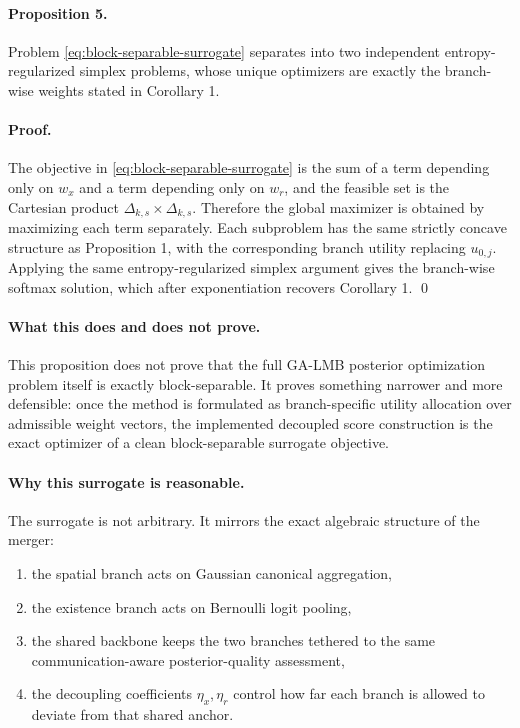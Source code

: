 \paragraph{Proposition 5.}
Problem \eqref{eq:block-separable-surrogate} separates into two independent entropy-regularized simplex problems, whose unique optimizers are exactly the branch-wise weights stated in Corollary 1.

\paragraph{Proof.}
The objective in \eqref{eq:block-separable-surrogate} is the sum of a term depending only on $w_x$ and a term depending only on $w_r$, and the feasible set is the Cartesian product $\Delta_{k,s}\times\Delta_{k,s}$. Therefore the global maximizer is obtained by maximizing each term separately. Each subproblem has the same strictly concave structure as Proposition 1, with the corresponding branch utility replacing $u_{0,j}$. Applying the same entropy-regularized simplex argument gives the branch-wise softmax solution, which after exponentiation recovers Corollary 1. \qed

\paragraph{What this does and does not prove.}
This proposition does not prove that the full GA-LMB posterior optimization problem itself is exactly block-separable. It proves something narrower and more defensible: once the method is formulated as branch-specific utility allocation over admissible weight vectors, the implemented decoupled score construction is the exact optimizer of a clean block-separable surrogate objective.

\paragraph{Why this surrogate is reasonable.}
The surrogate is not arbitrary. It mirrors the exact algebraic structure of the merger:
\begin{enumerate}
\item the spatial branch acts on Gaussian canonical aggregation,
\item the existence branch acts on Bernoulli logit pooling,
\item the shared backbone keeps the two branches tethered to the same communication-aware posterior-quality assessment,
\item the decoupling coefficients $\eta_x,\eta_r$ control how far each branch is allowed to deviate from that shared anchor.
\end{enumerate}


